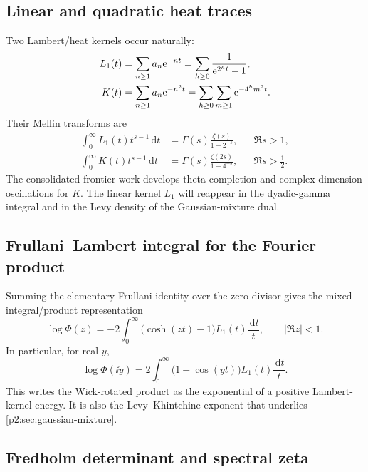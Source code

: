 \documentclass[11pt]{article}
\theoremstyle{definition}
\theoremstyle{remark}
\newcommand{\dd}{\,\mathrm d}
\begin{document}
\subsection{Linear and quadratic heat traces}

Two Lambert/heat kernels occur naturally:
\begin{align}
 L_1(t)&=\sum_{n\ge1}a_n\mathrm e^{-nt}
       =\sum_{h\ge0}\frac{1}{\mathrm e^{2^ht}-1},               \label{p2:eq:L1}\\
 K(t)&=\sum_{n\ge1}a_n\mathrm e^{-n^2t}
       =\sum_{h\ge0}\sum_{m\ge1}\mathrm e^{-4^hm^2t}.          \label{p2:eq:Kheat}
\end{align}
Their Mellin transforms are
\begin{align}
 \int_0^\infty L_1(t)t^{s-1}\dd t
 &=\Gamma(s)\frac{\zeta(s)}{1-2^{-s}},&&\Re s>1,
                                                               \label{p2:eq:L1-Mellin}\\
 \int_0^\infty K(t)t^{s-1}\dd t
 &=\Gamma(s)\frac{\zeta(2s)}{1-4^{-s}},&&\Re s>\tfrac12.
                                                               \label{p2:eq:K-Mellin}
\end{align}
The consolidated frontier work develops theta completion and complex-dimension oscillations
for $K$.  The linear kernel $L_1$ will reappear in the dyadic-gamma integral and in the Levy
density of the Gaussian-mixture dual.

\subsection{Frullani--Lambert integral for the Fourier product}

Summing the elementary Frullani identity over the zero divisor gives the mixed
integral/product representation
\begin{equation}
 \boxed{\quad
 \log\Phi(z)
 =-2\int_0^\infty\bigl(\cosh(zt)-1\bigr)L_1(t)\frac{\dd t}{t},
 \qquad |\Re z|<1.
 \quad}                                                  \label{p2:eq:Frullani-Phi}
\end{equation}
In particular, for real $y$,
\begin{equation}
 \log\Phi(\ii y)
 =2\int_0^\infty\bigl(1-\cos(yt)\bigr)L_1(t)\frac{\dd t}{t}.  \label{p2:eq:Phi-imag-integral}
\end{equation}
This writes the Wick-rotated product as the exponential of a positive Lambert-kernel energy.
It is also the Levy--Khintchine exponent that underlies \cref{p2:sec:gaussian-mixture}.

\subsection{Fredholm determinant and spectral zeta}
\end{document}
